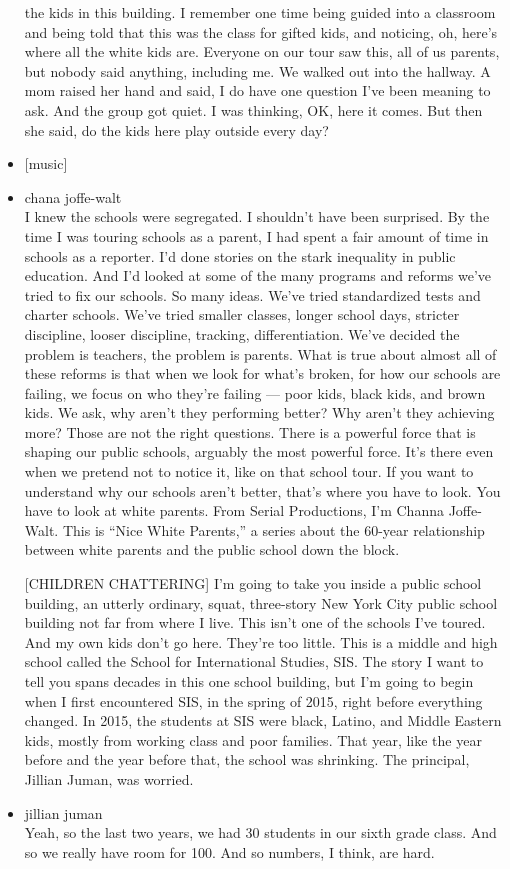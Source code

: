 \begin{itemize}
  the kids in this building. I remember one time being guided into a
  classroom and being told that this was the class for gifted kids, and
  noticing, oh, here's where all the white kids are. Everyone on our
  tour saw this, all of us parents, but nobody said anything, including
  me. We walked out into the hallway. A mom raised her hand and said, I
  do have one question I've been meaning to ask. And the group got
  quiet. I was thinking, OK, here it comes. But then she said, do the
  kids here play outside every day?
\item
  {[}music{]}
\item
  chana joffe-walt\\
  I knew the schools were segregated. I shouldn't have been surprised.
  By the time I was touring schools as a parent, I had spent a fair
  amount of time in schools as a reporter. I'd done stories on the stark
  inequality in public education. And I'd looked at some of the many
  programs and reforms we've tried to fix our schools. So many ideas.
  We've tried standardized tests and charter schools. We've tried
  smaller classes, longer school days, stricter discipline, looser
  discipline, tracking, differentiation. We've decided the problem is
  teachers, the problem is parents. What is true about almost all of
  these reforms is that when we look for what's broken, for how our
  schools are failing, we focus on who they're failing --- poor kids,
  black kids, and brown kids. We ask, why aren't they performing better?
  Why aren't they achieving more? Those are not the right questions.
  There is a powerful force that is shaping our public schools, arguably
  the most powerful force. It's there even when we pretend not to notice
  it, like on that school tour. If you want to understand why our
  schools aren't better, that's where you have to look. You have to look
  at white parents. From Serial Productions, I'm Channa Joffe-Walt. This
  is ``Nice White Parents,'' a series about the 60-year relationship
  between white parents and the public school down the block.

  {[}CHILDREN CHATTERING{]} I'm going to take you inside a public school
  building, an utterly ordinary, squat, three-story New York City public
  school building not far from where I live. This isn't one of the
  schools I've toured. And my own kids don't go here. They're too
  little. This is a middle and high school called the School for
  International Studies, SIS. The story I want to tell you spans decades
  in this one school building, but I'm going to begin when I first
  encountered SIS, in the spring of 2015, right before everything
  changed. In 2015, the students at SIS were black, Latino, and Middle
  Eastern kids, mostly from working class and poor families. That year,
  like the year before and the year before that, the school was
  shrinking. The principal, Jillian Juman, was worried.
\item
  jillian juman\\
  Yeah, so the last two years, we had 30 students in our sixth grade
  class. And so we really have room for 100. And so numbers, I think,
  are hard.
\end{itemize}

